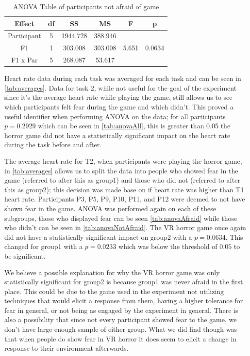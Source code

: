 \documentclass[manuscript,screen,review]{acmart}
\begin{document}
\begin{table}[ht]
    \centering
    \begin{tabular}{|c|c|c|c|c|c|}
    \hline
    Effect        & df & SS       & MS       & F    & p      \\ \hline
    Participant   & 5 & 1944.728 & 388.946  &      &        \\ \hline
    F1            & 1  & 303.008   & 303.008   & 5.651 & 0.0634 \\ \hline
    F1 x Par      & 5 & 268.087  & 53.617   &      &        \\ \hline
    \end{tabular}
    \caption{ANOVA Table of participants not afraid of game}
    \label{tab:anovaNotAfraid}
\end{table}
Heart rate data during each task was averaged for each task and can be seen in \autoref{tab:averages}. Data for task 2, while not useful for the goal of the experiment since it's the average heart rate while playing the game, still allows us to see which participants felt fear during the game and which didn't. This proved a useful identifier when performing ANOVA on the data; for all participants \(p=0.2929\) which can be seen in \autoref{tab:anovaAll}, this is greater than 0.05 the horror game did not have a statistically significant impact on the heart rate during the task before and after.

The average heart rate for T2, when participants were playing the horror game, in \autoref{tab:averages} allows us to split the data into people who showed fear in the game (referred to after this as group1) and those who did not (referred to after this as group2); this decision was made base on if heart rate was higher than T1 heart rate. Participants P3, P5, P9, P10, P11, and P12 were deemed to not have shown fear in the game. ANOVA was performed again on each of these subgroups, those who displayed fear can be seen \autoref{tab:anovaAfraid} while those who didn't can be seen in \autoref{tab:anovaNotAfraid}. The VR horror game once again did not have a statistically significant impact on group2 with a \(p=0.0634\). This changed for group1 with a \(p=0.0233\) which was below the threshold of \(0.05\) to be significant.

We believe a possible explanation for why the VR horror game was only statistically significant for group2 is because group1 was never afraid in the first place. This could be due to the game used in the experiment not utilizing techniques that would elicit a response from them, having a higher tolerance for fear in general, or not being as engaged by the experiment in general. There is also a possibility that since not every participant showed fear to the game, we don't have large enough sample of either group. What we did find though was that when people do show fear in VR horror it does seem to elicit a change in response to their environment afterwards.
\end{document}
